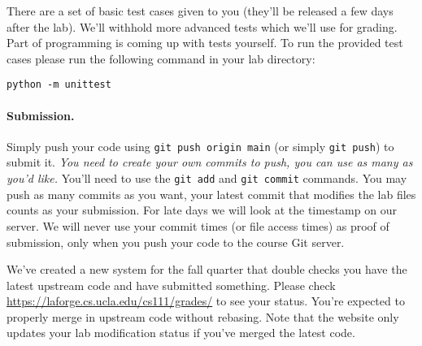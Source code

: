 There are a set of basic test cases given to you (they'll be released a few
days after the lab).
We'll withhold more advanced tests which we'll use for grading.
Part of programming is coming up with tests yourself.
To run the provided test cases please run the following command in your lab
directory:

\begin{lstlisting}[xleftmargin=2em]
python -m unittest
\end{lstlisting}

\paragraph{Submission.}

Simply push your code using \lstinline|git push origin main| (or simply
\lstinline|git push|) to submit it.
\textit{You need to create your own commits to push, you can use as many
as you'd like.}
You'll need to use the \texttt{git add} and \texttt{git commit} commands.
You may push as many commits as you want, your latest commit that modifies
the lab files counts as your submission.
For late days we will look at the timestamp on our server.
We will never use your commit times (or file access times) as proof of
submission, only when you push your code to the course Git server.

We've created a new system for the fall quarter that double checks you
have the latest upstream code and have submitted something.
Please check
\url{https://laforge.cs.ucla.edu/cs111/grades/}
to see your status.
You're expected to properly merge in upstream code without rebasing.
Note that the website only updates your lab modification status
if you've merged the latest code.


